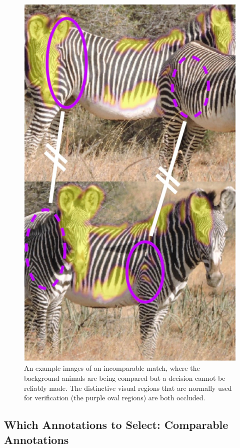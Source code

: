 \begin{figure}[!t]
    \begin{center}
        \includegraphics[width=0.67\linewidth]{resources/ca-cannottell.pdf}
    \end{center}
    \caption{An example images of an incomparable match, where the background animals are being compared but a decision cannot be reliably made.  The distinctive visual regions that are normally used for verification (the purple oval regions) are both occluded.}
    \label{fig:ca-cannottell}
\end{figure}

\subsection{Which Annotations to Select: Comparable Annotations}

